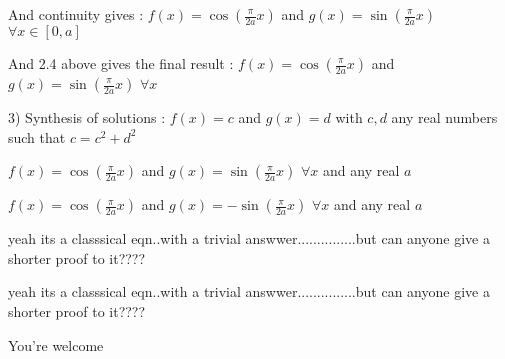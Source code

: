 \begin{solution}
And continuity gives :
$ f(x)=\cos(\frac{\pi}{2a}x)$ and $ g(x)=\sin(\frac{\pi}{2a}x)$ $ \forall x\in[0,a]$

And 2.4 above gives the final result :
$ f(x)=\cos(\frac{\pi}{2a}x)$ and $ g(x)=\sin(\frac{\pi}{2a}x)$ $ \forall x$


3) Synthesis of solutions :
$ f(x)=c$ and $ g(x)=d$ with $ c,d$ any real numbers such that $ c=c^2+d^2$

$ f(x)=\cos(\frac{\pi}{2a}x)$ and $ g(x)=\sin(\frac{\pi}{2a}x)$ $ \forall x$ and any real $ a$

$ f(x)=\cos(\frac{\pi}{2a}x)$ and $ g(x)=-\sin(\frac{\pi}{2a}x)$ $ \forall x$ and any real $ a$
\end{solution}



\begin{solution}
	yeah its a classsical eqn..with a trivial answwer...............but can anyone give  a  shorter proof to it????
\end{solution}



\begin{solution}
	\begin{tcolorbox}yeah its a classsical eqn..with a trivial answwer...............but can anyone give  a  shorter proof to it????\end{tcolorbox}

You're welcome
\end{solution}



